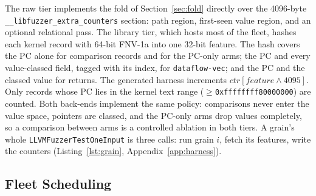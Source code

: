 \documentclass{article}
\begin{document}
The raw tier implements the fold of Section~\ref{sec:fold} directly over the
4096-byte \texttt{\_\_libfuzzer\_extra\_counters} section: path region,
first-seen value region, and an optional relational pass. The library tier,
which hosts most of the fleet, hashes each kernel record with 64-bit FNV-1a
into one 32-bit feature. The hash covers the PC alone for comparison records
and for the PC-only arms; the PC and every value-classed field, tagged with
its index, for \texttt{dataflow-vec}; and the PC and the classed value for
returns. The generated harness increments
$\mathit{ctr}[\mathit{feature} \wedge 4095]$. Only records whose PC lies in
the kernel text range ($\geq$\texttt{0xffffffff80000000}) are counted. Both
back-ends implement the same policy: comparisons never enter the value space,
pointers are classed, and the PC-only arms drop values completely, so a
comparison between arms is a controlled ablation in both tiers. A grain's
whole \texttt{LLVMFuzzerTestOneInput} is three calls: run grain $i$, fetch
its features, write the counters (Listing~\ref{lst:grain},
Appendix~\ref{app:harness}).

\subsection{Fleet Scheduling}
\end{document}
